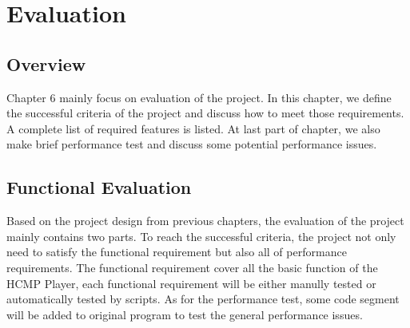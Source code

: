
\chapter{Evaluation} %



\ifpdf
    \graphicspath{{X/figures/PNG/}{X/figures/PDF/}{X/figures/}}
\else
    \graphicspath{{X/figures/EPS/}{X/figures/}}
\fi


\section{Overview}
Chapter 6 mainly focus on evaluation of the project. In 
this chapter, we define the successful criteria of the project and discuss
how to meet those requirements. A complete list of required features is
listed. At last part of chapter, we also make brief performance test and 
discuss some potential performance issues.

\section{Functional Evaluation}
Based on the project design from previous chapters, the evaluation of the 
project mainly contains 
two parts. To reach the successful criteria, the project not only need to 
satisfy the functional requirement but also all of performance requirements. 
The 
functional requirement cover all the basic function of the HCMP Player, 
each functional requirement will be 
either manully tested or automatically tested by scripts. As for the
performance test, some code segment will be added to original program to
test the general performance issues.

